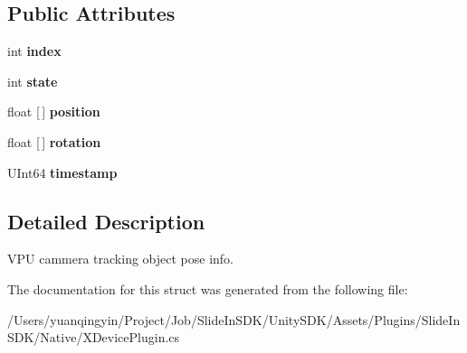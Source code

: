 \subsection*{Public Attributes}
\begin{DoxyCompactItemize}
\item 
\mbox{\label{struct_ximmerse_1_1_input_system_1_1_x_device_plugin_1_1_x_attr_tracking_info_a469449ff56b16b906f0a254c80ac969b}} 
int {\bfseries index}
\item 
\mbox{\label{struct_ximmerse_1_1_input_system_1_1_x_device_plugin_1_1_x_attr_tracking_info_a5ca5f3dffcac5d7b5d69a0c5e889e476}} 
int {\bfseries state}
\item 
\mbox{\label{struct_ximmerse_1_1_input_system_1_1_x_device_plugin_1_1_x_attr_tracking_info_a7980c8f4e71a32d2f0dceb456693c6da}} 
float \mbox{[}$\,$\mbox{]} {\bfseries position}
\item 
\mbox{\label{struct_ximmerse_1_1_input_system_1_1_x_device_plugin_1_1_x_attr_tracking_info_afa62fec916577d7cf401b2cb0128459a}} 
float \mbox{[}$\,$\mbox{]} {\bfseries rotation}
\item 
\mbox{\label{struct_ximmerse_1_1_input_system_1_1_x_device_plugin_1_1_x_attr_tracking_info_a503917826c6e96d0ce2ddff7e6c4bb32}} 
U\+Int64 {\bfseries timestamp}
\end{DoxyCompactItemize}


\subsection{Detailed Description}
V\+PU cammera tracking object pose info. 

The documentation for this struct was generated from the following file\+:\begin{DoxyCompactItemize}
\item 
/\+Users/yuanqingyin/\+Project/\+Job/\+Slide\+In\+S\+D\+K/\+Unity\+S\+D\+K/\+Assets/\+Plugins/\+Slide\+In\+S\+D\+K/\+Native/X\+Device\+Plugin.\+cs\end{DoxyCompactItemize}
